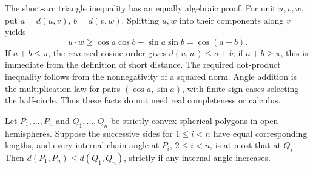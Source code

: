 The short-arc triangle inequality has an equally algebraic proof.
For unit $u,v,w$, put $a=d(u,v)$, $b=d(v,w)$. Splitting $u,w$ into
their components along $v$ yields
\[
 u\cdot w\geq\cos a\cos b-\sin a\sin b=\cos(a+b).
\]
If $a+b\leq\pi$, the reversed cosine order gives
$d(u,w)\leq a+b$; if $a+b\geq\pi$, this is immediate from the
definition of short distance. The required dot-product inequality
follows from the nonnegativity of a squared norm. Angle addition is
the multiplication law for pairs $(\cos a,\sin a)$, with finite
sign cases selecting the half-circle. Thus these facts do not need
real completeness or calculus.

\begin{lemma}\label{lem:arm}
Let $P_1,\ldots,P_n$ and $Q_1,\ldots,Q_n$ be strictly convex spherical
polygons in open hemispheres. Suppose the successive sides for
$1\leq i<n$ have equal corresponding lengths, and every internal
chain angle at $P_i$, $2\leq i<n$, is at most that at $Q_i$.
Then $d(P_1,P_n)\leq d(Q_1,Q_n)$, strictly if any internal angle
increases.
\end{lemma}
